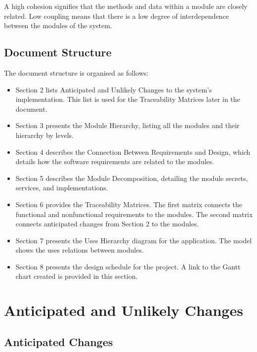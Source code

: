 \documentclass[12pt, titlepage]{article}
\begin{document}
A high cohesion signifies that the methods and data within a module are closely related. Low coupling means that there is a low degree of interdependence between the modules of the system. 

\subsection{Document Structure}
	The document structure is organised as follows:
\begin{itemize}

\item Section 2 lists Anticipated and Unlikely Changes to the system's implementation. This list is used for the Traceability Matrices later in the document.

\item Section 3 presents the Module Hierarchy, listing all the modules and their hierarchy by levels. 

\item Section 4 describes the Connection Between Requirements and Design, which details how the software requirements are related to the modules. 

\item Section 5 describes the Module Decomposition, detailing the module secrets, services, and implementations. 

\item Section 6 provides the Traceability Matrices. The first matrix connects the functional and nonfunctional requirements to the modules. The second matrix connects anticipated changes from Section 2 to the modules.

\item Section 7 presents the Uses Hierarchy diagram for the application. The model shows the uses relations between modules.

\item Section 8 presents the design schedule for the project. A link to the Gantt chart created is provided in this section.

\end{itemize}	


\section{Anticipated and Unlikely Changes} \label{SecChange}
\subsection{Anticipated Changes} \label{SecAchange}
\end{document}
